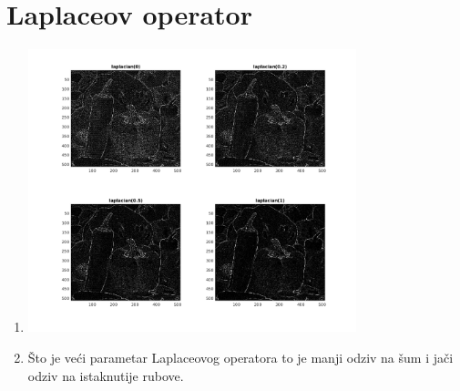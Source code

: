\documentclass[12pt, a4]{report}
\begin{document}
\section{Laplaceov operator}
\begin{enumerate}
    \item
        \begin{minipage}{\linewidth}
            \centering
            \includegraphics[width=0.75\textwidth]{laplacian}
        \end{minipage}
    \item
        Što je veći parametar Laplaceovog operatora to je manji odziv na šum i jači odziv na istaknutije rubove.

\end{enumerate}
\end{document}
